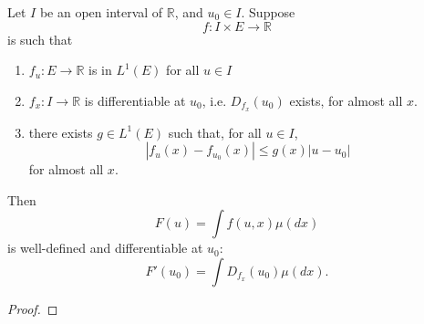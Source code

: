 \documentclass[12pt]{article}
\begin{document}
\begin{theorem}
	Let $I$ be an open interval of $\mathbb{R}$, and $u_0\in I$. Suppose 
	\begin{equation*}
		f:I\times E \to \mathbb{R}
	\end{equation*}
	is such that 
	\begin{enumerate}
		\item $f_u: E\to \mathbb{R}$ is in $L^1(E)$ for all $u\in I$
		\item $f_x: I\to \mathbb{R}$ is differentiable at $u_0$, i.e. $D_{f_x}(u_0)$ exists, for almost all $x$.
		\item there exists $g\in L^1(E)$ such that, for all $u\in I$, 
			\begin{equation*}
				|f_u(x)-f_{u_0}(x)| \leq g(x) |u-u_0|	
			\end{equation*}
			for almost all $x$.
	\end{enumerate}
	Then 
	\begin{equation*}
		F(u) = \int f(u,x)\mu(dx)
	\end{equation*}
	is well-defined and differentiable at $u_0$:
	\begin{equation*}
		F'(u_0) = \int D_{f_x}(u_0) \mu(dx).
	\end{equation*}
\end{theorem}
\begin{proof}
\end{proof}
\end{document}
